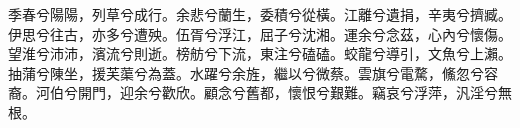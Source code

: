 
\begin{pinyinscope}
季春兮陽陽，列草兮成行。余悲兮蘭生，委積兮從橫。江離兮遺捐，辛夷兮擠臧。伊思兮往古，亦多兮遭殃。伍胥兮浮江，屈子兮沈湘。運余兮念茲，心內兮懷傷。望淮兮沛沛，濱流兮則逝。榜舫兮下流，東注兮磕磕。蛟龍兮導引，文魚兮上瀨。抽蒲兮陳坐，援芙蕖兮為蓋。水躍兮余旌，繼以兮微蔡。雲旗兮電騖，鯈忽兮容裔。河伯兮開門，迎余兮歡欣。顧念兮舊都，懷恨兮艱難。竊哀兮浮萍，汎淫兮無根。


\end{pinyinscope}